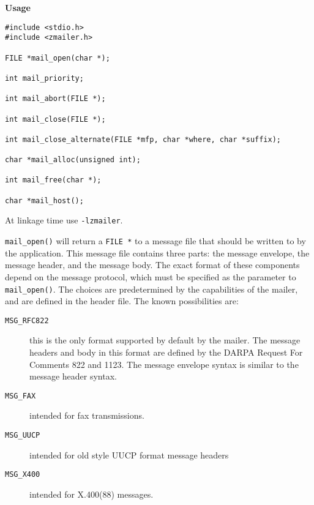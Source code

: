 
{\bf Usage}
\begin{verbatim}
#include <stdio.h>
#include <zmailer.h>

FILE *mail_open(char *);

int mail_priority;

int mail_abort(FILE *);

int mail_close(FILE *);

int mail_close_alternate(FILE *mfp, char *where, char *suffix);

char *mail_alloc(unsigned int);

int mail_free(char *);

char *mail_host();
\end{verbatim}


At linkage time use {\tt -lzmailer}.

{\tt mail\_open()} will return a {\tt FILE *} to a message
file that should be written to by the application. This
message file contains three parts: the message envelope,
the message header, and the message body. The exact format of
these components depend on the message protocol,
which must be specified as the parameter to {\tt mail\_open()}.
The choices are predetermined by the capabilities of the
mailer, and are defined in the header file. The known
possibilities are:

\begin{description}
\item[ {\tt MSG\_RFC822}] \mbox{}

this is the only format supported 
by default by the mailer. The message headers and body in this format
are defined by the DARPA Request For Comments 822 and 1123. 
The message envelope syntax is similar to the message header syntax.



\item[ {\tt MSG\_FAX}] \mbox{}

intended for fax transmissions.



\item[ {\tt MSG\_UUCP}] \mbox{}

intended for old style UUCP format message headers



\item[ {\tt MSG\_X400}] \mbox{}

intended for X.400(88) messages.

\end{description}


